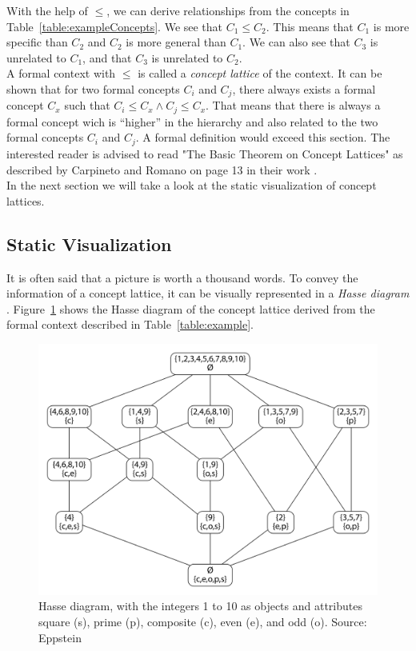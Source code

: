 \documentclass[11pt]{report}
\begin{document}
With the help of $\le$, we  can derive relationships from the concepts in Table~\ref{table:exampleConcepts}. We see that $C_1 \le C_2$. This means that $C_1$ is more specific than $C_2$ and $C_2$ is more general than $C_1$. We can also see that $C_3$ is unrelated to $C_1$, and that $C_3$ is unrelated to $C_2$. \\

A formal context with $\le$ is called a \textit{concept lattice} of the context. It can be shown that for two formal concepts $C_i$ and $C_j$, there always exists a formal concept $C_x$ such that $C_i \le C_x \wedge C_j \le C_x$. That means that there is always a formal concept wich is ``higher'' in the hierarchy and also related to the two formal concepts $C_i$ and $C_j$. A formal definition would exceed this section. The interested reader is advised to read "The Basic Theorem on Concept Lattices" as described by Carpineto and Romano on page 13 in their work \cite{carpineto2004concept}.\\

In the next section we will take a look at the static visualization of concept lattices.

\subsection{Static Visualization}

It is often said that a picture is worth a thousand words. To convey the information of a concept lattice, it can be visually represented in a \textit{Hasse diagram} \cite{Ganter2012}. Figure~\ref{figure:example} shows the Hasse diagram of the concept lattice derived from the formal context described in Table~\ref{table:example}. \\

\begin{figure}[!ht]
	\centering
	\includegraphics[width=\linewidth]{./images/fcaExample}
\caption{Hasse diagram, with the integers 1 to 10 as objects and attributes square (s), prime (p), composite (c), even (e), and odd (o). Source: Eppstein \cite{fcaexample}}
\label{figure:example}
\end{figure}
\end{document}
